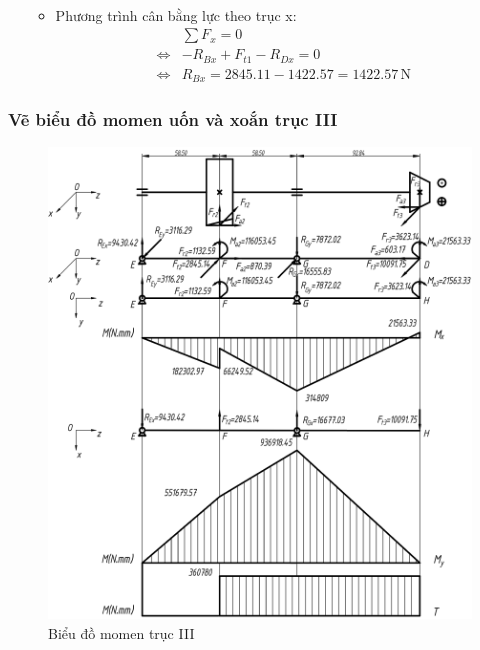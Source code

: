 \begin{itemize}
\begin{itemize}
\begin{align*}
                            \end{align*}
                            \item Phương trình cân bằng lực theo trục x:
                            \begin{align*}
                                &\sum{F_{x}} = 0 \\
                                \Leftrightarrow& -R_{Bx} + F_{t1} - R_{Dx} = 0 \\
                                \Leftrightarrow& R_{Bx} = 2845.11 - 1422.57 = 1422.57  \, \mathrm{N}
                            \end{align*}
                        \end{itemize}
                \end{itemize}
            \subsubsection{Vẽ biểu đồ momen uốn và xoắn trục III}
                \begin{figure}[H]
                    \centering
                    \includegraphics[width = 1.1\textwidth]{pictures/momen_III.png}
                    \caption{Biểu đồ momen trục III}
                    \label{fig:momen_III}
                \end{figure}
